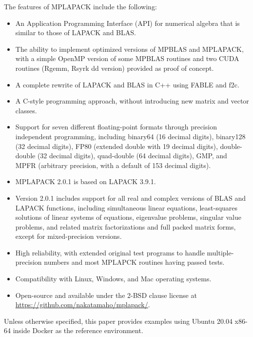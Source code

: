 \documentclass[12pt]{article}
\begin{document}
The features of MPLAPACK include the following:
\begin{itemize}
\item An Application Programming Interface (API) for numerical algebra that is similar to those of LAPACK and BLAS.
\item The ability to implement optimized versions of MPBLAS and MPLAPACK, with a simple OpenMP version of some MPBLAS routines and two CUDA routines (Rgemm, Rsyrk dd version) provided as proof of concept.
\item A complete rewrite of LAPACK and BLAS in C++ using FABLE and f2c.
\item A C-style programming approach, without introducing new matrix and vector classes.
\item Support for seven different floating-point formats through precision independent programming, including binary64 (16 decimal digits), binary128 (32 decimal digits), FP80 (extended double with 19 decimal digits), double-double (32 decimal digits), quad-double (64 decimal digits), GMP, and MPFR (arbitrary precision, with a default of 153 decimal digits).
\item MPLAPACK 2.0.1 is based on LAPACK 3.9.1.
\item Version 2.0.1 includes support for all real and complex versions of BLAS and LAPACK functions, including simultaneous linear equations, least-squares solutions of linear systems of equations, eigenvalue problems, singular value problems, and related matrix factorizations and full packed matrix forms, except for mixed-precision versions.
\item High reliability, with extended original test programs to handle multiple-precision numbers and most MPLAPCK routines having passed tests.
\item Compatibility with Linux, Windows, and Mac operating systems.
\item Open-source and available under the 2-BSD clause license at \url{https://github.com/nakatamaho/mplapack/}.
\end{itemize}

Unless otherwise specified, this paper provides examples using Ubuntu 20.04 x86-64 inside Docker as the reference environment.
\end{document}
